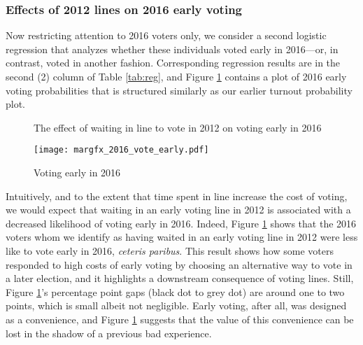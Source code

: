 \documentclass[12pt,titlepage]{article}
\begin{document}



\subsubsection*{Effects of 2012 lines on 2016 early voting}

Now restricting attention to 2016 voters only, we consider a second
logistic regression that analyzes whether these individuals voted
early in 2016---or, in contrast, voted in another fashion.
Corresponding regression results are in the second (2) column of Table
\ref{tab:reg}, and Figure \ref{fig:atevotingearly2016} contains a plot
of 2016 early voting probabilities that is structured similarly as our
earlier turnout probability plot.

\begin{figure}[!ht]
  \caption{The effect of waiting in line to vote in 2012 on voting early in 2016}
  \centering\texttt{[image: margfx\_2016\_vote\_early.pdf]}
  \caption{Voting early in 2016}
  \label{fig:atevotingearly2016}
\end{figure}

Intuitively, and to the extent that time spent in line increase the
cost of voting, we would expect that waiting in an early voting line
in 2012 is associated with a decreased likelihood of voting early in
2016.  Indeed, Figure \ref{fig:atevotingearly2016} shows that the 2016
voters whom we identify as having waited in an early voting line in
2012 were less like to vote early in 2016, \emph{ceteris paribus}.
This result shows how some voters responded to high costs of early
voting by choosing an alternative way to vote in a later election, and
it highlights a downstream consequence of voting lines.  Still, Figure
\ref{fig:atevotingearly2016}'s percentage point gaps (black dot to
grey dot) are around one to two points, which is small albeit not
negligible.  Early voting, after all, was designed as a convenience,
and Figure \ref{fig:atevotingearly2016} suggests that the value of
this convenience can be lost in the shadow of a previous bad
experience.
\end{document}
